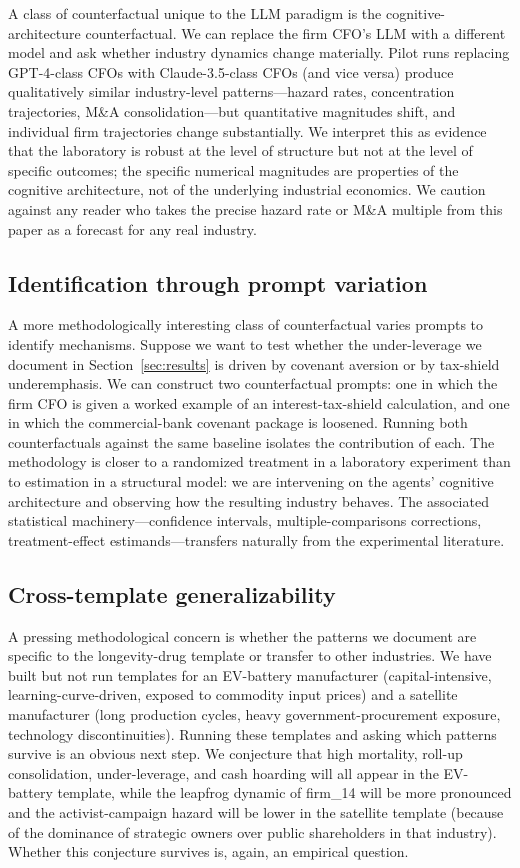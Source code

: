\documentclass[11pt]{article}
\begin{document}
A class of counterfactual unique to the LLM paradigm is the
cognitive-architecture counterfactual. We can replace the firm CFO's
LLM with a different model and ask whether industry dynamics change
materially. Pilot runs replacing GPT-4-class CFOs with Claude-3.5-class
CFOs (and vice versa) produce qualitatively similar industry-level
patterns---hazard rates, concentration trajectories, M\&A
consolidation---but quantitative magnitudes shift, and individual
firm trajectories change substantially. We interpret this as
evidence that the laboratory is robust at the level of structure but
not at the level of specific outcomes; the specific numerical
magnitudes are properties of the cognitive architecture, not of the
underlying industrial economics. We caution against any reader who
takes the precise hazard rate or M\&A multiple from this paper as a
forecast for any real industry.

\subsection{Identification through prompt variation}

A more methodologically interesting class of counterfactual varies
prompts to identify mechanisms. Suppose we want to test whether the
under-leverage we document in Section~\ref{sec:results} is driven by
covenant aversion or by tax-shield underemphasis. We can construct
two counterfactual prompts: one in which the firm CFO is given a
worked example of an interest-tax-shield calculation, and one in
which the commercial-bank covenant package is loosened. Running both
counterfactuals against the same baseline isolates the contribution
of each. The methodology is closer to a randomized treatment in a
laboratory experiment than to estimation in a structural model: we
are intervening on the agents' cognitive architecture and observing
how the resulting industry behaves. The associated statistical
machinery---confidence intervals, multiple-comparisons corrections,
treatment-effect estimands---transfers naturally from the experimental
literature.

\subsection{Cross-template generalizability}

A pressing methodological concern is whether the patterns we document
are specific to the longevity-drug template or transfer to other
industries. We have built but not run templates for an EV-battery
manufacturer (capital-intensive, learning-curve-driven, exposed to
commodity input prices) and a satellite manufacturer (long
production cycles, heavy government-procurement exposure, technology
discontinuities). Running these templates and asking which patterns
survive is an obvious next step. We conjecture that high mortality,
roll-up consolidation, under-leverage, and cash hoarding will all
appear in the EV-battery template, while the leapfrog dynamic of
firm\_14 will be more pronounced and the activist-campaign hazard
will be lower in the satellite template (because of the dominance of
strategic owners over public shareholders in that industry). Whether
this conjecture survives is, again, an empirical question.
\end{document}
